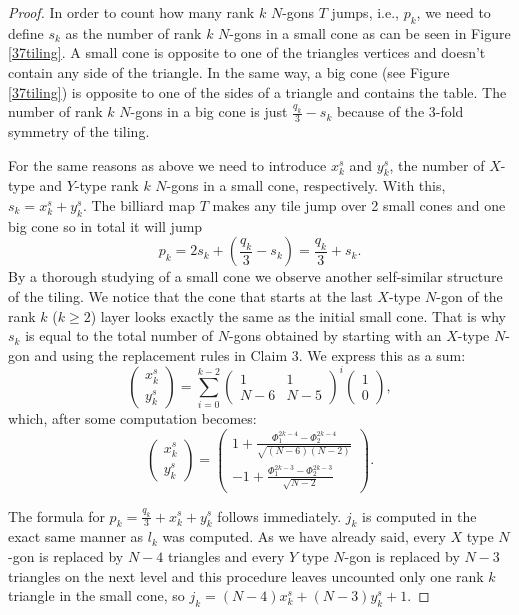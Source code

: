 \documentclass[11pt, oneside]{article}   	%
\begin{document}
\begin{proof}
In order to count how many rank $k$ $N$-gons $T$ jumps, i.e., $p_k$, we need to define $s_k$ as the number of rank $k$ $N$-gons in a small cone as can be seen in Figure \ref{37tiling}. A small cone is opposite to one of the triangles vertices and doesn't contain any side of the triangle. In the same way, a big cone (see Figure \ref{37tiling}) is opposite to one of the sides of a triangle and contains the table. The number of rank $k$ $N$-gons in a big cone is just $\frac{q_k}{3}-s_k$ because of the 3-fold symmetry of the tiling.

For the same reasons as above we need to introduce $x^s_k$ and $y^s_k$, the number of $X$-type and $Y$-type rank $k$ $N$-gons in a small cone, respectively. With this, $s_k=x^s_k+y^s_k$. The billiard map $T$ makes any tile jump over 2 small cones and one big cone so in total it will jump $$p_k=2s_k+(\frac{q_k}{3}-s_k)=\frac{q_k}{3}+s_k.$$
By a thorough studying of a small cone we  observe another self-similar structure of the tiling. We notice that the cone that starts at the last $X$-type $N$-gon of the rank $k$ ($k\geq 2$) layer looks exactly the same as the initial small cone. That is why $s_k$ is equal to the total number of $N$-gons obtained by starting with an $X$-type $N$-gon and using the replacement rules in Claim 3. We express this as a sum:
\[\left(\begin{array}{c}
x^s_k \\
y^s_k
\end{array}\right)=\sum_{i=0}^{k-2}\left(\begin{array}{cc}
1&1 \\
N-6 & N-5
\end{array}\right)^i\left(\begin{array}{c}
1 \\
0
\end{array}\right),\] 
which, after some computation becomes:
\[\left(\begin{array}{c}
x^s_k \\
y^s_k
\end{array}\right)=\left(\begin{array}{c}
1+\frac{\Phi_1^{2k-4}-\Phi_2^{2k-4}}{\sqrt{(N-6)(N-2)}} \\
-1+\frac{\Phi_1^{2k-3}-\Phi_2^{2k-3}}{\sqrt{N-2}}
\end{array}\right).\] 

The formula for $p_k=\frac{q_k}{3}+x^s_k+y^s_k$ follows immediately. $j_k$ is computed in the exact same manner as $l_k$ was computed. As we have already said, every $X$ type $N$-gon is replaced by $N-4$ triangles and every $Y$ type $N$-gon is replaced by $N-3$ triangles on the next level and this procedure leaves uncounted only one rank $k$ triangle in the small cone, so $j_k=(N-4)x^s_k+(N-3)y^s_k+1$.
\end{proof}
\end{document}
